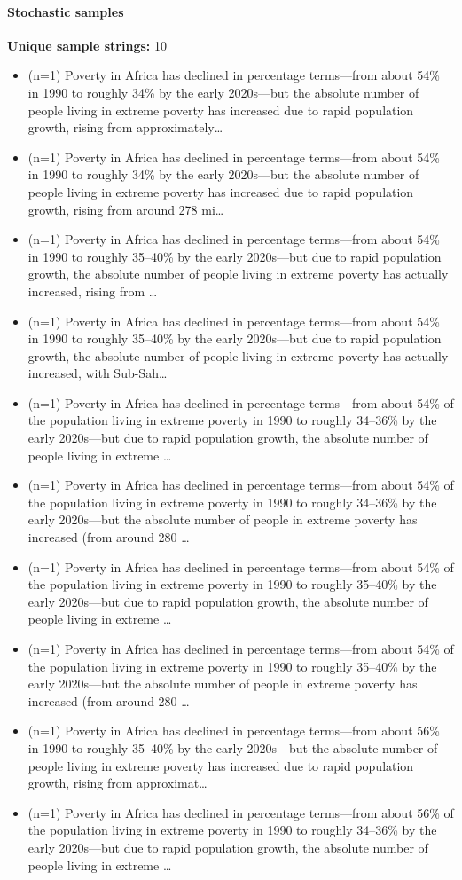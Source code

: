 \documentclass[11pt]{article}
\begin{document}
\paragraph{Stochastic samples}
\textbf{Unique sample strings:} 10\\
\small
\begin{itemize}
\item (n=1) Poverty in Africa has declined in percentage terms—from about 54\% in 1990 to roughly 34\% by the early 2020s—but the absolute number of people living in extreme poverty has increased due to rapid population growth, rising from approximately…
\item (n=1) Poverty in Africa has declined in percentage terms—from about 54\% in 1990 to roughly 34\% by the early 2020s—but the absolute number of people living in extreme poverty has increased due to rapid population growth, rising from around 278 mi…
\item (n=1) Poverty in Africa has declined in percentage terms—from about 54\% in 1990 to roughly 35–40\% by the early 2020s—but due to rapid population growth, the absolute number of people living in extreme poverty has actually increased, rising from …
\item (n=1) Poverty in Africa has declined in percentage terms—from about 54\% in 1990 to roughly 35–40\% by the early 2020s—but due to rapid population growth, the absolute number of people living in extreme poverty has actually increased, with Sub-Sah…
\item (n=1) Poverty in Africa has declined in percentage terms—from about 54\% of the population living in extreme poverty in 1990 to roughly 34–36\% by the early 2020s—but due to rapid population growth, the absolute number of people living in extreme …
\item (n=1) Poverty in Africa has declined in percentage terms—from about 54\% of the population living in extreme poverty in 1990 to roughly 34–36\% by the early 2020s—but the absolute number of people in extreme poverty has increased (from around 280 …
\item (n=1) Poverty in Africa has declined in percentage terms—from about 54\% of the population living in extreme poverty in 1990 to roughly 35–40\% by the early 2020s—but due to rapid population growth, the absolute number of people living in extreme …
\item (n=1) Poverty in Africa has declined in percentage terms—from about 54\% of the population living in extreme poverty in 1990 to roughly 35–40\% by the early 2020s—but the absolute number of people in extreme poverty has increased (from around 280 …
\item (n=1) Poverty in Africa has declined in percentage terms—from about 56\% in 1990 to roughly 35–40\% by the early 2020s—but the absolute number of people living in extreme poverty has increased due to rapid population growth, rising from approximat…
\item (n=1) Poverty in Africa has declined in percentage terms—from about 56\% of the population living in extreme poverty in 1990 to roughly 34–36\% by the early 2020s—but due to rapid population growth, the absolute number of people living in extreme …
\end{itemize}
\end{document}
